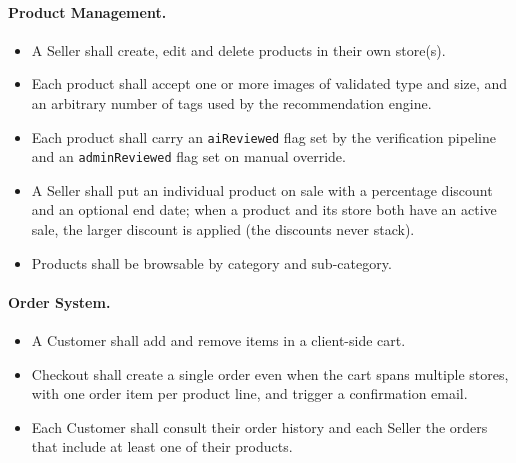 \paragraph{Product Management.}
\begin{itemize}[leftmargin=*,itemsep=1pt]
  \item A Seller shall create, edit and delete products in their own
        store(s).
  \item Each product shall accept one or more images of validated type
        and size, and an arbitrary number of tags used by the
        recommendation engine.
  \item Each product shall carry an \texttt{aiReviewed} flag set by the
        verification pipeline and an \texttt{adminReviewed} flag set on
        manual override.
  \item A Seller shall put an individual product on sale with a
        percentage discount and an optional end date; when a product and
        its store both have an active sale, the larger discount is
        applied (the discounts never stack).
  \item Products shall be browsable by category and sub-category.
\end{itemize}

\paragraph{Order System.}
\begin{itemize}[leftmargin=*,itemsep=1pt]
  \item A Customer shall add and remove items in a client-side cart.
  \item Checkout shall create a single order even when the cart spans
        multiple stores, with one order item per product line, and
        trigger a confirmation email.
  \item Each Customer shall consult their order history and each Seller
        the orders that include at least one of their products.
\end{itemize}

